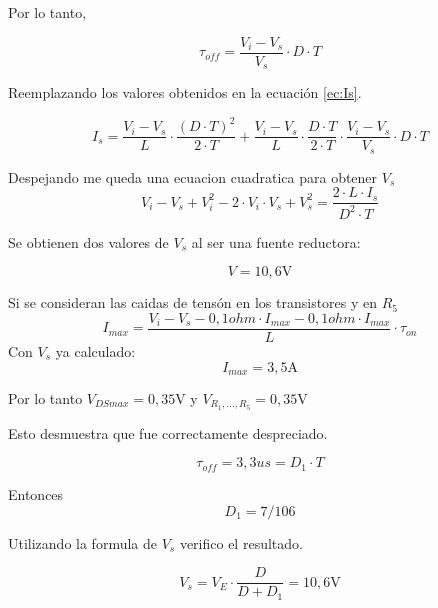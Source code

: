 Por lo tanto,

\begin{equation}
 	\si{\tau}_{off}  = \frac{{V_{i} - V_{s}}}{V_s} \cdot D \cdot T 
\end{equation}

Reemplazando los valores obtenidos en la ecuación \eqref{ec:Is}.

\begin{equation}
 	I_s = \frac{{V_{i} - V_{s}}}{L} \cdot \frac{(D \cdot T)^2 }{2 \cdot T} + \frac{{V_{i} - V_{s}}}{L} \cdot \frac{D \cdot T }{2 \cdot T} \cdot \frac{{V_{i} - V_{s}}}{V_s} \cdot D \cdot T
\end{equation}

Despejando me queda una ecuacion cuadratica para obtener $V_s$
\begin{equation}
	V_i - V_s + V^2_i -2 \cdot V_i \cdot V_s + V^2_s =  \frac{2 \cdot L \cdot I_s}{D^2 \cdot T}
\end{equation}

Se obtienen dos valores de $V_s$ al ser una fuente reductora:

\begin{equation}
 	 \boxed{V = 10,6\si{\volt} }
\end{equation}

Si se consideran las caidas de tensón en los transistores y en $R_5$
\begin{equation}
	I_{max} = \frac{V_i - V_s - 0,1 \si{ohm} \cdot I_{max} - 0,1 \si{ohm} \cdot I_{max} }{L} \cdot \si{\tau}_{on}
\end{equation}
Con $V_s$ ya calculado:
\begin{equation}
	 \boxed{I_{max} = 3,5 \si{\ampere}}
\end{equation}


Por lo tanto $V_{DSmax} = 0,35 \si{\volt}$ y $V_{R_1,...,R_5} = 0,35 \si{\volt}$

Esto desmuestra que fue correctamente despreciado.


\begin{equation}
	\boxed{\tau_{off} = 3,3 us = D_1 \cdot T}
\end{equation}

Entonces
\begin{equation}
 	\boxed{D_1  = 7/ 106 }
\end{equation}

Utilizando la formula de $V_s$ verifico el resultado.

\begin{equation}
 	V_s  = V_E \cdot \frac{D}{D + D_1} = 10,6\si{\volt}
\end{equation}
